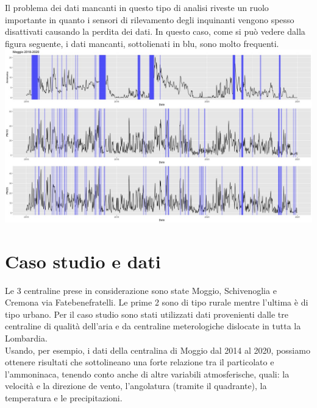 \documentclass{article}
\begin{document}
Il problema dei dati mancanti in questo tipo di analisi riveste un ruolo importante
in quanto i sensori di rilevamento degli inquinanti vengono spesso disattivati causando la perdita 
dei dati. In questo caso, come si può vedere dalla figura seguente, i dati mancanti, sottolienati in blu, sono molto frequenti.
\\\includegraphics[scale=0.4]{Immagini/Moggio 2018-2020.jpeg}
    
\section{Caso studio e dati}

Le 3 centraline prese in considerazione sono state Moggio, Schivenoglia e 
Cremona via Fatebenefratelli. Le prime 2 sono di tipo rurale mentre l'ultima è di tipo urbano.
Per il caso studio sono stati utilizzati dati provenienti dalle 
tre centraline di qualità dell'aria e da centraline meterologiche dislocate in tutta la Lombardia.
\\Usando, per esempio, i dati della centralina di Moggio dal 2014 al 2020, possiamo ottenere risultati 
che sottolineano una forte relazione tra il particolato e l'ammoninaca, tenendo conto anche di altre variabili
atmosferische, quali: la velocità e la direzione de vento, l'angolatura (tramite il quadrante), la temperatura e le precipitazioni.
\end{document}
